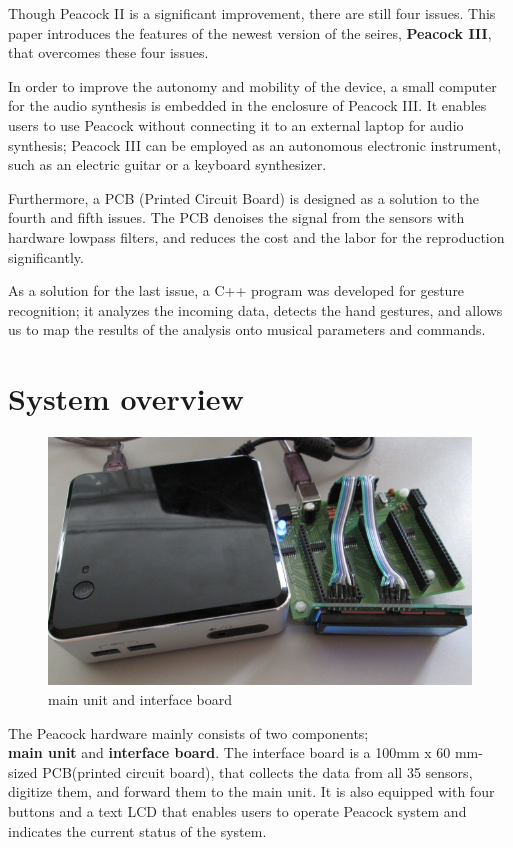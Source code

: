 \documentclass{nime-alternate}
\begin{document}
Though Peacock II is a significant improvement, there are still four issues. This paper introduces the features of the newest version of the seires, {\bf Peacock III}, that overcomes these four issues. 


In order to improve the autonomy and mobility of the device, a small computer for the audio synthesis is embedded in the enclosure of Peacock III. It enables users to use Peacock without connecting it to an external laptop for audio synthesis; Peacock III can be employed as an autonomous electronic instrument, such as an electric guitar or a keyboard synthesizer. 

Furthermore, a PCB (Printed Circuit Board) is designed as a solution to the fourth and fifth issues. The PCB  denoises the signal from the sensors with hardware lowpass filters, and reduces the cost and the labor for the reproduction significantly. 

As a solution for the last issue, a C++ program was developed for gesture recognition; it analyzes the incoming data, detects the hand gestures, and allows us to map the results of the analysis onto musical parameters and commands.

\section{System overview}
\begin{figure}[htbp]
       \begin{center}
              \includegraphics[scale=0.9]{interface_main.jpg}
       \end{center}
       \caption{main unit and interface board}
       \label{fig:interface_main}
\end{figure}

The Peacock hardware mainly consists of two components;\\
\textbf{main unit} and \textbf{interface board}. The interface board is a 100mm x 60 mm-sized PCB(printed circuit board), that collects the data from all 35 sensors, digitize them, and forward them to the main unit. It is also equipped with four buttons and a text LCD that enables users to operate Peacock system and indicates the current status of the system.
\end{document}
